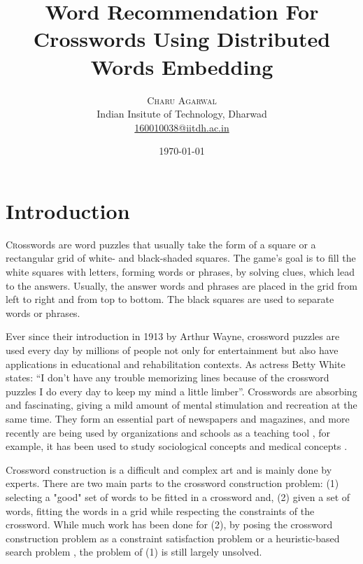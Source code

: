 \documentclass[twoside]{article}
\title{Word Recommendation For Crosswords Using Distributed Words Embedding } %
\author{%
\textsc{Charu Agarwal} \\[1ex] %
\normalsize Indian Insitute of Technology, Dharwad \\ %
\normalsize \href{mailto:160010038@iitdh.ac.in}{160010038@iitdh.ac.in} %
}
\date{\today} %
\begin{document}
\maketitle


\section{Introduction}
\label{sec:sec1}
\lettrine[nindent=0em,lines=3]{C} rosswords are word puzzles that usually take the form of a square or a rectangular grid of white- and black-shaded squares. The game's goal is to fill the white squares with letters, forming words or phrases, by solving clues, which lead to the answers. Usually, the answer words and phrases are placed in the grid from left to right and from top to bottom. The black squares are used to separate words or phrases.

Ever since their introduction in 1913 by Arthur Wayne, crossword puzzles are used every day by millions of people not only for entertainment but also have applications in educational and rehabilitation contexts. As actress Betty White states: ``I don't have any trouble memorizing lines because of the crossword puzzles I do every day to keep my mind a little limber''. Crosswords are absorbing and fascinating, giving a mild amount of mental stimulation and recreation at the same time. They form an essential part of newspapers and magazines, and more recently are being used by organizations and schools as a teaching tool \cite{cite1}, for example, it has been used to study sociological concepts \cite{cite2} and medical concepts \cite{cite3}.

Crossword construction is a difficult and complex art and is mainly done by experts. There are two main parts to the crossword construction problem: (1) selecting a "good" set of words to be fitted in a crossword and, (2) given a set of words, fitting the words in a grid while respecting the constraints of the crossword. While much work has been done for (2), by posing the crossword construction problem as a constraint satisfaction problem \cite{cite4} or a heuristic-based search problem \cite{cite5}, the problem of (1) is still largely unsolved.
\end{document}
